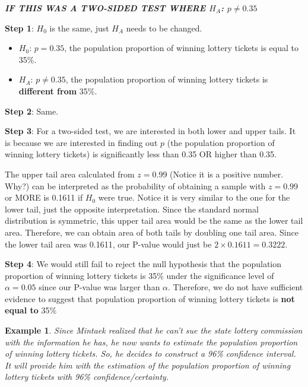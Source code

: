 \documentclass[12pt]{article}
\newcounter{lecnum}
\newtheorem{example}{Example}[lecnum]
\begin{document}
\vspace{0.15 cm}

\textbf{\textit{IF THIS WAS A TWO-SIDED TEST WHERE $H_A$: $p \neq 0.35$}}

\vspace{0.15 cm}

\noindent \textbf{Step 1}: $H_0$ is the same, just $H_A$ needs to be changed.
\vspace{-9 pt}
\begin{itemize}
	\item $H_0$: $p = 0.35$, the population proportion of winning lottery tickets is equal to 35\%.
	\item $H_A$: $p \neq 0.35$, the population proportion of winning lottery tickets is \textbf{different from} 35\%.
\end{itemize}
\vspace{-5 pt}
\noindent \textbf{Step 2}: Same.

\noindent \textbf{Step 3}: For a two-sided test, we are interested in both lower and upper tails. It is because we are interested in finding out $p$ (the population proportion of winning lottery tickets) is significantly less than 0.35 OR higher than 0.35.

The upper tail area calculated from $z = 0.99$ (Notice it is a positive number. Why?) can be interpreted as the probability of obtaining a sample with $z = 0.99$ or MORE is 0.1611 if $H_0$ were true. Notice it is very similar to the one for the lower tail, just the opposite interpretation. Since the standard normal distribution is symmetric, this upper tail area would be the same as the lower tail area. Therefore, we can obtain area of both tails by doubling one tail area. Since the lower tail area was 0.1611, our P-value would just be $2 \times 0.1611 = 0.3222$.

\noindent \textbf{Step 4}: We would still fail to reject the null hypothesis that the population proportion of winning lottery tickets is 35\% under the significance level of $\alpha = 0.05$ since our P-value was larger than $\alpha$. Therefore, we do not have sufficient evidence to suggest that population proportion of winning lottery tickets is \textbf{not equal to} 35\%

\pagebreak

\begin{example}
	Since Mintaek realized that he can't sue the state lottery commission with the information he has, he now wants to estimate the population proportion of winning lottery tickets. So, he decides to construct a 96\% confidence interval. It will provide him with the estimation of the population proportion of winning lottery tickets with 96\% confidence/certainty.
\end{example}
	
\end{document}
